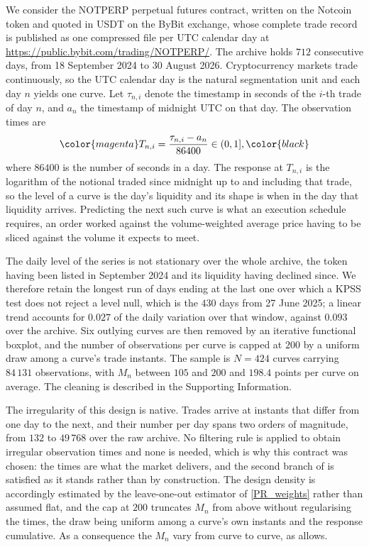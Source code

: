 \color{magenta}
We consider the NOTPERP perpetual futures contract, written on the Notcoin token and quoted in USDT on the ByBit exchange, whose complete trade record is published as one compressed file per UTC calendar day at \url{https://public.bybit.com/trading/NOTPERP/}. The archive holds $712$ consecutive days, from 18 September 2024 to 30 August 2026. Cryptocurrency markets trade continuously, so the UTC calendar day is the natural segmentation unit and each day $n$ yields one curve. Let $\tau_{n,i}$ denote the timestamp in seconds of the $i$-th trade of day $n$, and $a_n$ the timestamp of midnight UTC on that day. The observation times are
\color{black}
\begin{equation}\label{eq:notperp:tni}
	\color{magenta}T_{n,i} = \frac{\tau_{n,i} - a_n}{86400} \in (0,1],\color{black}
\end{equation}
\color{magenta}
where $86400$ is the number of seconds in a day. The response at $T_{n,i}$ is the logarithm of the notional traded since midnight up to and including that trade, so the level of a curve is the day's liquidity and its shape is when in the day that liquidity arrives. Predicting the next such curve is what an execution schedule requires, an order worked against the volume-weighted average price having to be sliced against the volume it expects to meet.

The daily level of the series is not stationary over the whole archive, the token having been listed in September 2024 and its liquidity having declined since. We therefore retain the longest run of days ending at the last one over which a KPSS test does not reject a level null, which is the $430$ days from 27 June 2025; a linear trend accounts for $0.027$ of the daily variation over that window, against $0.093$ over the archive. Six outlying curves are then removed by an iterative functional boxplot, and the number of observations per curve is capped at $200$ by a uniform draw among a curve's trade instants. The sample is $N = 424$ curves carrying $84\,131$ observations, with $M_n$ between $105$ and $200$ and $198.4$ points per curve on average. The cleaning is described in the Supporting Information.

The irregularity of this design is native. Trades arrive at instants that differ from one day to the next, and their number per day spans two orders of magnitude, from $132$ to $49\,768$ over the raw archive. No filtering rule is applied to obtain irregular observation times and none is needed, which is why this contract was chosen: the times are what the market delivers, and the second branch of  is satisfied as it stands rather than by construction. The design density is accordingly estimated by the leave-one-out estimator of \eqref{PR_weights} rather than assumed flat, and the cap at $200$ truncates $M_n$ from above without regularising the times, the draw being uniform among a curve's own instants and the response cumulative. As a consequence the $M_n$ vary from curve to curve, as  allows.

